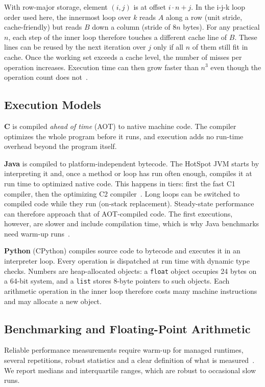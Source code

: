 \documentclass[conference,a4paper]{IEEEtran}
\newcommand{\code}[1]{\texttt{#1}}
\begin{document}
With row-major storage, element $(i,j)$ is at offset $i \cdot n + j$. In the
i-j-k loop order used here, the innermost loop over $k$ reads $A$ along a row
(unit stride, cache-friendly) but reads $B$ down a column (stride of $8n$
bytes). For any practical $n$, each step of the inner loop therefore touches a
different cache line of $B$. These lines can be reused by the next iteration
over $j$ only if all $n$ of them still fit in cache. Once the working set
exceeds a cache level, the number of misses per operation increases. Execution
time can then grow faster than $n^3$ even though the operation count does
not~\cite{lam1991}.

\subsection{Execution Models}
\textbf{C} is compiled \emph{ahead of time} (AOT) to native machine code. The
compiler optimizes the whole program before it runs, and execution adds no
run-time overhead beyond the program itself.

\textbf{Java} is compiled to platform-independent bytecode. The HotSpot JVM
starts by interpreting it and, once a method or loop has run often enough,
compiles it at run time to optimized native code. This happens in tiers: first
the fast C1 compiler, then the optimizing C2 compiler~\cite{paleczny2001}. Long
loops can be switched to compiled code while they run (on-stack replacement).
Steady-state performance can therefore approach that of AOT-compiled code. The
first executions, however, are slower and include compilation time, which is
why Java benchmarks need warm-up runs~\cite{georges2007}.

\textbf{Python} (CPython) compiles source code to bytecode and executes it in an
interpreter loop. Every operation is dispatched at run time with dynamic type
checks. Numbers are heap-allocated objects: a \code{float} object occupies 24
bytes on a 64-bit system, and a \code{list} stores 8-byte pointers to such
objects. Each arithmetic operation in the inner loop therefore costs many
machine instructions and may allocate a new object.

\subsection{Benchmarking and Floating-Point Arithmetic}
Reliable performance measurements require warm-up for managed runtimes,
several repetitions, robust statistics and a clear definition of what is
measured~\cite{georges2007,kalibera2013}. We report medians and interquartile
ranges, which are robust to occasional slow runs.
\end{document}
